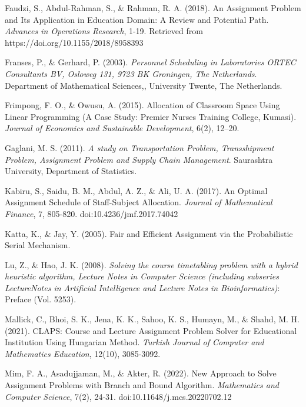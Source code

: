 \documentclass[11pt]{report}
\begin{document}
\begin{description}
		\item Faudzi, S., Abdul-Rahman, S., \& Rahman, R. A. (2018). An Assignment Problem and Its
		Application in Education Domain: A Review and Potential Path. \emph{Advances in Operations
		Research}, 1-19. Retrieved from https://doi.org/10.1155/2018/8958393
		
		\item Franses, P., \& Gerhard, P. (2003). \emph{Personnel Scheduling in Laboratories ORTEC Consultants BV,	Osloweg 131, 9723 BK Groningen, The Netherlands}. Department of Mathematical
		Sciences,, University Twente, The Netherlands.
		
		\item Frimpong, F. O., \& Owusu, A. (2015). Allocation of Classroom Space Using Linear Programming
		(A Case Study: Premier Nurses Training College, Kumasi). \emph{Journal of Economics and
		Sustainable Development}, 6(2), 12–20.
	
		\item Gaglani, M. S. (2011). \emph{A study on Transportation Problem, Transshipment Problem, Assignment Problem and Supply Chain Management}. Saurashtra University, Department of Statistics.
		
		\item Kabiru, S., Saidu, B. M., Abdul, A. Z., \& Ali, U. A. (2017). An Optimal Assignment Schedule of
		Staff-Subject Allocation. \emph{Journal of Mathematical Finance}, 7, 805-820.
		doi:10.4236/jmf.2017.74042
		
		\item Katta, K., \& Jay, Y. (2005). Fair and Efficient Assignment via the Probabilistic Serial Mechanism.
		
		\item Lu, Z., \& Hao, J. K. (2008). \emph{Solving the course timetabling problem with a hybrid heuristic
		algorithm, Lecture Notes in Computer Science (including subseries LectureNotes in
		Artificial Intelligence and Lecture Notes in Bioinformatics)}: Preface (Vol. 5253).
		
		Mallick, C., Bhoi, S. K., Jena, K. K., Sahoo, K. S., Humayn, M., \& Shahd, M. H. (2021). CLAPS:
		Course and Lecture Assignment Problem Solver for Educational Institution Using Hungarian Method. \emph{Turkish Journal of Computer and Mathematics Education}, 12(10), 3085-3092.
		
		\item Mim, F. A., Asadujjaman, M., \& Akter, R. (2022). New Approach to Solve Assignment Problems
		with Branch and Bound Algorithm. \emph{Mathematics and Computer Science}, 7(2), 24-31.
		doi:10.11648/j.mcs.20220702.12
		

\end{description}
\end{document}
